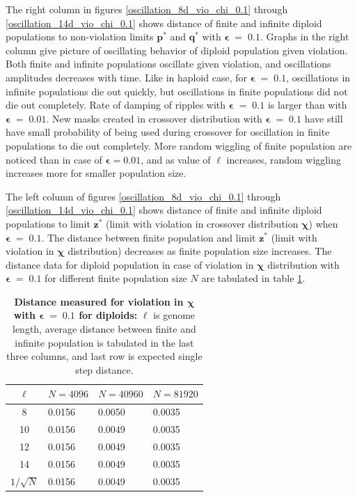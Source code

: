 \clearpage

The right column in figures \ref{oscillation_8d_vio_chi_0.1} through \ref{oscillation_14d_vio_chi_0.1} 
shows distance of finite and infinite diploid populations to non-violation limits $\bm{p^\ast}$ and $\bm{q^\ast}$ with $\bm{\epsilon} \;=\; 0.1$. 
Graphs in the right column give picture of oscillating behavior of diploid population given violation. 
Both finite and infinite populations oscillate given violation, and oscillations amplitudes decreases with time. 
Like in haploid case, for $\bm{\epsilon} \;=\; 0.1$, oscillations in infinite populations die out quickly, 
but oscillations in finite populations did not die out completely. Rate of damping of ripples with $\bm{\epsilon} \;=\; 0.1$ is  
larger than with $\bm{\epsilon} \;=\; 0.01$. New masks created in crossover distribution with $\bm{\epsilon} \;=\; 0.1$ have still have small  
probability of being used during crossover for oscillation in finite populations to die out completely. 
More random wiggling of finite population are noticed than in case of $\bm{\epsilon} = 0.01$, and as value of $\ell$ 
increases, random wiggling increases more for smaller population size.

The left column of figures \ref{oscillation_8d_vio_chi_0.1} through \ref{oscillation_14d_vio_chi_0.1} 
shows distance of finite and infinite diploid populations to limit $\bm{z^\ast}$ 
(limit with violation in crossover distribution $\bm{\chi}$) when $\bm{\epsilon} \;=\; 0.1$. 
The distance between finite population and limit $\bm{z}^\ast$ (limit with violation in $\bm{\chi}$ distribution) 
decreases as finite population size increases. 
The distance data for diploid population in case of violation in $\bm{\chi}$ distribution 
with $\bm{\epsilon} \;=\; 0.1$ for different finite population size $N$ are tabulated in table \ref{distanceChiDipEps0.1}. 


\begin{table}[ht]
\caption{\textbf{Distance measured for violation in $\bm{\chi}$ with $\bm{\epsilon} \;=\; 0.1$ for diploids:} $\ell$ is genome length, 
average distance between finite and infinite population is tabulated in the last three columns, and last row is expected single step distance.}
\centering
\begin{tabularx}{0.75\textwidth}{ c *{3}{X}}
\toprule
$\ell$ & $N = 4096$ & $N = 40960$ & $N = 81920$  \\
\midrule
8 & 0.0156	&  0.0050	& 0.0035 \\
10 & 0.0156	&  0.0049	& 0.0035 \\
12 & 0.0156	&  0.0049	& 0.0035 \\
14 & 0.0156	&  0.0049	& 0.0035 \\
\midrule
$1/\sqrt{N}$ & 0.0156 & 0.0049 & 0.0035 \\
\bottomrule
\end{tabularx}
\label{distanceChiDipEps0.1}
\end{table} 

